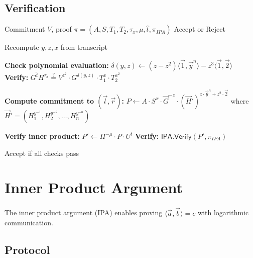 \documentclass[11pt,a4paper]{article}
\newcommand{\IPA}{\mathsf{IPA}}
\begin{document}
\subsection{Verification}

\begin{algorithm}
\caption{Bulletproof Range Verification}
\label{alg:range-verify}
\begin{algorithmic}[1]
\Require Commitment $V$, proof $\pi = (A, S, T_1, T_2, \tau_x, \mu, \hat{t}, \pi_{IPA})$
\Ensure Accept or Reject

\State Recompute $y, z, x$ from transcript

\State \textbf{Check polynomial evaluation:}
\State $\delta(y, z) \gets (z - z^2) \langle \vec{1}, \vec{y}^n \rangle - z^3 \langle \vec{1}, \vec{2} \rangle$
\State \textbf{Verify:} $G^{\hat{t}} H^{\tau_x} \stackrel{?}{=} V^{z^2} \cdot G^{\delta(y,z)} \cdot T_1^x \cdot T_2^{x^2}$

\State \textbf{Compute commitment to $(\vec{l}, \vec{r})$:}
\State $P \gets A \cdot S^x \cdot \vec{G}^{-z} \cdot (\vec{H}')^{z \cdot \vec{y}^n + z^2 \cdot \vec{2}}$
\State where $\vec{H}' = (H_1^{y^{-1}}, H_2^{y^{-2}}, \ldots, H_n^{y^{-n}})$

\State \textbf{Verify inner product:}
\State $P' \gets H^{-\mu} \cdot P \cdot U^{\hat{t}}$
\State \textbf{Verify:} $\IPA.\mathsf{Verify}(P', \pi_{IPA})$

\State \Return Accept if all checks pass
\end{algorithmic}
\end{algorithm}

\section{Inner Product Argument}
\label{sec:ipa}

The inner product argument (IPA) enables proving $\langle \vec{a}, \vec{b} \rangle = c$ with logarithmic communication.

\subsection{Protocol}
\end{document}
